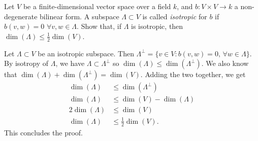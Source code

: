 \begin{problem}
Let $V$ be a finite-dimensional vector space over a field $k$, and $b:V\times V\to k$ a non-degenerate bilinear form. A subspace $\Lambda\subset V$ is called {\em isotropic} for $b$ if $b(v,w)=0$ $\forall v,w\in\Lambda$. Show that, if $\Lambda$ is isotropic, then $\dim(\Lambda)\leq \frac12 \dim(V)$.
\end{problem}

Let $\Lambda\subset V$ be an isotropic subspace. Then $\Lambda^\perp = \{ v\in V : b(v,w)=0,\,\forall w\in \Lambda\}$. By isotropy of $\Lambda$, we have $\Lambda\subset\Lambda^\perp$ so $\dim(\Lambda) \leq \dim(\Lambda^\perp)$. We also know that $\dim(\Lambda) + \dim (\Lambda^\perp) = \dim(V)$. Adding the two together, we get 
\[
  \begin{aligned}
    \dim(\Lambda) &\leq \dim(\Lambda^\perp)\\
    \dim(\Lambda) &\leq \dim(V)-\dim(\Lambda)\\
    2\dim(\Lambda) &\leq \dim(V)\\
    \dim(\Lambda)&\leq \frac12 \dim(V).
  \end{aligned}
\] 
This concludes the proof.